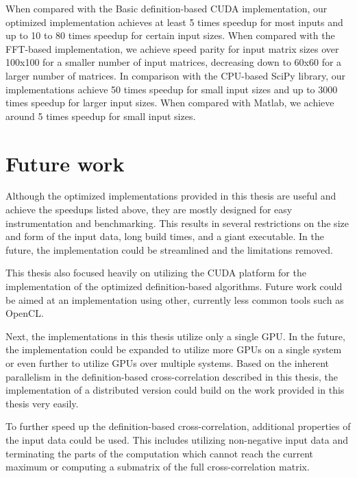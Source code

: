 When compared with the Basic definition-based CUDA implementation, our optimized implementation achieves at least 5 times speedup for most inputs and up to 10 to 80 times speedup for certain input sizes. When compared with the FFT-based implementation, we achieve speed parity for input matrix sizes over 100x100 for a smaller number of input matrices, decreasing down to 60x60 for a larger number of matrices. In comparison with the CPU-based SciPy library, our implementations achieve 50 times speedup for small input sizes and up to 3000 times speedup for larger input sizes. When compared with Matlab, we achieve around 5 times speedup for small input sizes.
 


\section{Future work}
Although the optimized implementations provided in this thesis are useful and achieve the speedups listed above, they are mostly designed for easy instrumentation and benchmarking. This results in several restrictions on the size and form of the input data, long build times, and a giant executable. In the future, the implementation could be streamlined and the limitations removed.

This thesis also focused heavily on utilizing the CUDA platform for the implementation of the optimized definition-based algorithms. Future work could be aimed at an implementation using other, currently less common tools such as OpenCL. 

Next, the implementations in this thesis utilize only a single GPU. In the future, the implementation could be expanded to utilize more GPUs on a single system or even further to utilize GPUs over multiple systems. Based on the inherent parallelism in the definition-based cross-correlation described in this thesis, the implementation of a distributed version could build on the work provided in this thesis very easily.

To further speed up the definition-based cross-correlation, additional properties of the input data could be used. This includes utilizing non-negative input data and terminating the parts of the computation which cannot reach the current maximum or computing a submatrix of the full cross-correlation matrix.